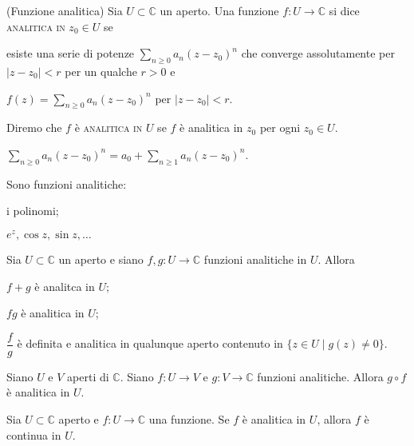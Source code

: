 \begin{defn}
  (Funzione analitica) Sia $U \subset \mathbb{C}$ un aperto. Una funzione $f:U \longrightarrow \mathbb{C}$ si dice \textsc{analitica in $z_0 \in U$} se
  \begin{nlist}
    \item esiste una serie di potenze $\displaystyle \sum_{n \ge 0} a_n(z-z_0)^n$ che converge assolutamente per $|z-z_0|<r$ per un qualche $r>0$ e
    \item $\displaystyle f(z)=\sum_{n \ge 0} a_n(z-z_0)^n$ per $|z-z_0|<r$.
  \end{nlist}
  Diremo che $f$ è \textsc{analitica in $U$} se $f$ è analitica in $z_0$ per ogni $z_0 \in U$.
\end{defn}

\begin{oss}
  $\displaystyle \sum_{n \ge 0} a_n(z-z_0)^n=a_0+\sum_{n \ge 1} a_n(z-z_0)^n$.
\end{oss}

\begin{ex}
  Sono funzioni analitiche:
  \begin{nlist}
    \item i polinomi;
    \item $e^z, \cos{z}, \sin{z}, \dots$
  \end{nlist}
\end{ex}

\begin{prop}
  Sia $U \subset \mathbb{C}$ un aperto e siano $f, g:U \longrightarrow \mathbb{C}$ funzioni analitiche in $U$. Allora
  \begin{nlist}
    \item $f+g$ è analitca in $U$;
    \item $fg$ è analitica in $U$;
    \item $\dfrac{f}{g}$ è definita e analitica in qualunque aperto contenuto in $\{z \in U \mid g(z) \not=0\}$.
  \end{nlist}
\end{prop}

\begin{prop}
  Siano $U$ e $V$ aperti di $\mathbb{C}$. Siano $f:U \longrightarrow V$ e $g:V \longrightarrow \mathbb{C}$ funzioni analitiche. Allora $g \circ f$ è analitica in $U$.
\end{prop}

\begin{prop}
  Sia $U \subset \mathbb{C}$ aperto e $f:U \longrightarrow \mathbb{C}$ una funzione. Se $f$ è analitica in $U$, allora $f$ è continua in $U$.
\end{prop}

